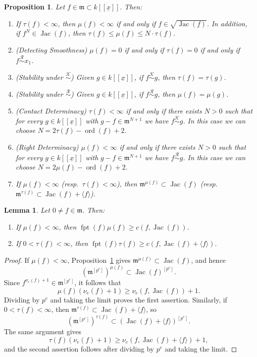 \documentclass[10pt,a4paper]{amsart}
\newtheorem{proposition}{Proposition}
\newtheorem{lemma}{Lemma}
\DeclareMathOperator{\Jac}{Jac}
\newcommand{\equivk}{\overset{\mathcal{K}}{\sim}}
\newcommand{\equivr}{\overset{\mathcal{R}}{\sim}}
\DeclareMathOperator{\fpt}{fpt}
\newcommand{\kx}{k[[\underline{x}]]}
\DeclareMathOperator{\ord}{ord}
\begin{document}
\begin{proposition}\label{prop:mt_basic}
Let $f\in\mathfrak{m}\subset\kx$. Then:
\begin{enumerate}
    \item If $\tau(f)<\infty$, then $\mu(f)<\infty$ if and only if $f\in\sqrt{\Jac(f)}$. In addition, if $f^N\in\Jac(f)$, then $\tau(f)\leq\mu(f)\leq N\cdot\tau(f)$.
    \item (Detecting Smoothness) $\mu(f)=0$ if and only if $\tau(f)=0$ if and only if $f\equivr x_1$.
    \item (Stability under $\equivk$) Given $g\in\kx$, if $f\equivk g$, then $\tau(f)=\tau(g)$.
    \item (Stability under $\equivr$) Given $g\in\kx$, if $f\equivr g$, then $\mu(f)=\mu(g)$.
    \item (Contact Determinacy) $\tau(f)<\infty$ if and only if there exists $N>0$ such that for every $g\in\kx$ with $g-f\in\mathfrak{m}^{N+1}$ we have $f\equivk g$. In this case we can choose $N=2\tau(f)-\ord(f)+2$.
    \item (Right Determinacy) $\mu(f)<\infty$ if and only if there exists $N>0$ such that for every $g\in\kx$ with $g-f\in\mathfrak{m}^{N+1}$ we have $f\equivr g$. In this case we can choose $N=2\mu(f)-\ord(f)+2$.
    \item If $\mu(f)<\infty$ (resp.\ $\tau(f)<\infty$), then $\mathfrak{m}^{\mu(f)}\subset\Jac(f)$ (resp.\ $\mathfrak{m}^{\tau(f)}\subset\Jac(f)+\langle f\rangle$).
\end{enumerate}
\end{proposition}

\begin{lemma}\label{lem:c(f,Jac)_fpt}
Let $0\neq f\in\mathfrak{m}$. Then:
\begin{enumerate}
    \item If $\mu(f)<\infty$, then $\fpt(f)\mu(f)\geq c(f,\Jac(f))$.
    \item If $0<\tau(f)<\infty$, then $\fpt(f)\tau(f)\geq c(f,\Jac(f)+\langle f\rangle)$.
\end{enumerate}
\end{lemma}

\begin{proof}
If $\mu(f)<\infty$, Proposition~\ref{prop:mt_basic} gives $\mathfrak{m}^{\mu(f)}\subset\Jac(f)$, and hence
\[
(\mathfrak{m}^{[p^e]})^{\mu(f)}\subset\Jac(f)^{[p^e]}.
\]
Since $f^{\nu_e(f)+1}\in\mathfrak{m}^{[p^e]}$, it follows that
\[
\mu(f)(\nu_e(f)+1)\geq\nu_e(f,\Jac(f))+1.
\]
Dividing by $p^e$ and taking the limit proves the first assertion.  Similarly, if $0<\tau(f)<\infty$, then $\mathfrak{m}^{\tau(f)}\subset\Jac(f)+\langle f\rangle$, so
\[
(\mathfrak{m}^{[p^e]})^{\tau(f)}
\subset(\Jac(f)+\langle f\rangle)^{[p^e]}.
\]
The same argument gives
\[
\tau(f)(\nu_e(f)+1)
\geq\nu_e(f,\Jac(f)+\langle f\rangle)+1,
\]
and the second assertion follows after dividing by $p^e$ and taking the limit.
\end{proof}
\end{document}
